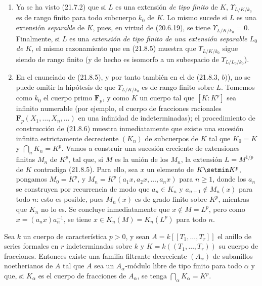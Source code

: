 \begin{remarks}[21.8.7]
\label{0.21.8.7-fr}
\begin{enumerate}
  \item[(i)] Ya se ha visto (21.7.2) que si $L$ es una extensión
  \emph{de tipo finito} de $K$, $\Upsilon_{L/K/k_0}$ es de rango finito para
  todo subcuerpo $k_0$ de $K$. Lo mismo sucede si $L$ es una extensión
  \emph{separable} de $K$, pues, en virtud de (20.6.19), se tiene
  $\Upsilon_{L/K/k_0}=0$. Finalmente, si $L$ es una \emph{extensión de tipo
  finito de una extensión separable $L_0$ de $K$}, el mismo razonamiento que
  en (21.8.5) muestra que $\Upsilon_{L/K/k_0}$ sigue siendo de rango finito
  (y de hecho es isomorfo a un subespacio de $\Upsilon_{L/L_0/k_0}$).

  \item[(ii)] En el enunciado de (21.8.5), y por tanto también en el de
  (21.8.3, $b)$), no se puede omitir la hipótesis de que
  $\Upsilon_{L/K/k_0}$ es de rango finito sobre $L$. Tomemos como $k_0$ el
  cuerpo primo $\mathbf F_p$, y como $K$ un cuerpo tal que $[K:K^p]$ sea
  infinito numerable (por ejemplo, el cuerpo de fracciones racionales
  $\mathbf F_p(X_1,\ldots,X_n,\ldots)$ en una infinidad de indeterminadas); el
  procedimiento de construcción de (21.8.6) muestra inmediatamente que existe
  una sucesión infinita estrictamente decreciente $(K_n)$ de subcuerpos de $K$
  tal que $K_0=K$ y $\bigcap_nK_n=K^p$. Vamos a construir una sucesión
  creciente de extensiones finitas $M_n$ de $K^p$, tal que, si $M$ es la unión
  de los $M_n$, la extensión $L=M^{1/p}$ de $K$ contradiga (21.8.5). Para
  ello, sea $x$ un elemento de $K\setmin K^p$, pongamos $M_0=K^p$, y
  $M_n=K^p(a_1x,a_2x,\ldots,a_nx)$ para $n\geqslant1$, donde los $a_n$ se
  construyen por recurrencia de modo que $a_n\in K_n$ y
  $a_{n+1}\notin M_n(x)$ para todo $n$: esto es posible, pues $M_n(x)$ es de
  grado finito sobre $K^p$, mientras que $K_n$ no lo es. Se concluye
  inmediatamente que $x\notin M=L^p$, pero como $x=(a_nx)a_n^{-1}$, se tiene
  $x\in K_n(M)=K_n(L^p)$ para todo $n$.
\end{enumerate}
\end{remarks}

\begin{proposition}[21.8.8]
\label{0.21.8.8-fr}
Sea $k$ un cuerpo de característica $p>0$, y sean
$A=k[[T_1,\ldots,T_r]]$ el anillo de series formales en $r$ indeterminadas
sobre $k$ y $K=k((T_1,\ldots,T_r))$ su cuerpo de fracciones. Entonces existe
una familia filtrante decreciente $(A_\alpha)$ de subanillos noetherianos de
$A$ tal que $A$ sea un $A_\alpha$-módulo libre de tipo finito para todo
$\alpha$ y que, si $K_\alpha$ es el cuerpo de fracciones de $A_\alpha$, se
tenga $\bigcap_\alpha K_\alpha=K^p$.
\end{proposition}

